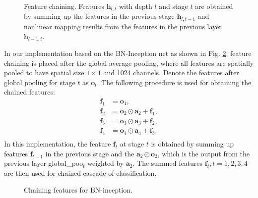 \documentclass[10pt,twocolumn,letterpaper]{article}
\begin{document}
\begin{figure}
\begin{center}
 \centerline{}
\end{center}
\vspace{-10pt}
   \caption{Feature chaining. Features $\mathbf{h}_{l,t}$ with depth $l$ and stage $t$ are obtained by summing up the features in the previous stage $\mathbf{h}_{l,t-1}$ and nonlinear mapping results from the features in the previous layer  $\mathbf{h}_{l-1,t}$.  }
\label{fig:Cascade}
\end{figure}

In our implementation based on the BN-Inception net as shown in Fig. \ref{fig:CascadeBN}, feature chaining is placed after the global average pooling, where all features are spatially pooled to have spatial size $1\times 1$  and 1024 channels. 
 Denote the features after global pooling  for stage $t$ as $\mathbf{o}_t$.
 The following procedure is used for obtaining the chained features:
\begin{equation}
\begin{split}
\mathbf{f}_{1} &=  \mathbf{o}_1, \\
\mathbf{f}_{2} &=  \mathbf{o}_{2} \odot  \mathbf{a}_2 + \mathbf{f}_1, \\
\mathbf{f}_{3} &=  \mathbf{o}_{3} \odot  \mathbf{a}_3 + \mathbf{f}_2, \\
\mathbf{f}_{4} &=  \mathbf{o}_{4} \odot  \mathbf{a}_4 + \mathbf{f}_3.\\
\end{split}
\end{equation}
In this implementation, the feature $\mathbf{f}_{t}$ at stage $t$ is obtained by summing up features $\mathbf{f}_{t-1}$ in the previous stage and the $\mathbf{a}_2 \odot \mathbf{o}_2$, which is the output from the previous layer global\_poo$_t$ weighted by $\mathbf{a}_2$.
The summed features $\mathbf{f}_t, t= 1, 2, 3, 4$ are then used for chained cascade of classification. 



\begin{figure}
\begin{center}
 \centerline{}
\end{center}
\vspace{-10pt}
   \caption{Chaining features for BN-inception. }
\label{fig:CascadeBN}
\end{figure}
\end{document}
